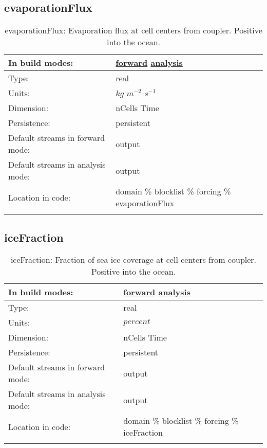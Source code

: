 \subsection[evaporationFlux]{evaporationFlux}
\label{subsec:var_sec_forcing_evaporationFlux}
\begin{center}
\begin{longtable}{| p{2.0in} | p{4.0in} |}
        \hline 
        In build modes: & \hyperref[subsec:forward_var_tab_forcing]{forward} \hyperref[subsec:analysis_var_tab_forcing]{analysis} \\
        \hline 
        Type: & real \\
        \hline 
        Units: & $kg$ $m^{-2}$ $s^{-1}$ \\
        \hline 
        Dimension: & nCells Time \\
        \hline 
        Persistence: & persistent \\
        \hline 
		 Default streams in forward mode: &  output \\
        \hline 
		 Default streams in analysis mode: &  output \\
        \hline 
		 Location in code: & domain \% blocklist \% forcing \% evaporationFlux \\
		 \hline 
    \caption{evaporationFlux: Evaporation flux at cell centers from coupler. Positive into the ocean.}
\end{longtable}
\end{center}
\subsection[iceFraction]{iceFraction}
\label{subsec:var_sec_forcing_iceFraction}
\begin{center}
\begin{longtable}{| p{2.0in} | p{4.0in} |}
        \hline 
        In build modes: & \hyperref[subsec:forward_var_tab_forcing]{forward} \hyperref[subsec:analysis_var_tab_forcing]{analysis} \\
        \hline 
        Type: & real \\
        \hline 
        Units: & $percent$ \\
        \hline 
        Dimension: & nCells Time \\
        \hline 
        Persistence: & persistent \\
        \hline 
		 Default streams in forward mode: &  output \\
        \hline 
		 Default streams in analysis mode: &  output \\
        \hline 
		 Location in code: & domain \% blocklist \% forcing \% iceFraction \\
		 \hline 
    \caption{iceFraction: Fraction of sea ice coverage at cell centers from coupler. Positive into the ocean.}
\end{longtable}
\end{center}
